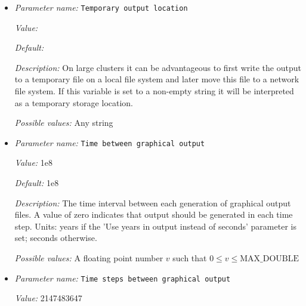 \begin{itemize}
{\it Value:} false


{\it Default:} false


{\it Description:} For free surface computations Aspect uses an Arbitrary-Lagrangian-Eulerian formulation to handle deforming the domain, so the mesh has its own velocity field.  This may be written as an output field by setting this parameter to true.


{\it Possible values:} A boolean value (true or false)
\item {\it Parameter name:} {\tt Temporary output location}
\label{parameters:Postprocess/Visualization/Temporary output location}


{\it Value:} 


{\it Default:} 


{\it Description:} On large clusters it can be advantageous to first write the output to a temporary file on a local file system and later move this file to a network file system. If this variable is set to a non-empty string it will be interpreted as a temporary storage location.


{\it Possible values:} Any string
\item {\it Parameter name:} {\tt Time between graphical output}
\label{parameters:Postprocess/Visualization/Time between graphical output}


{\it Value:} 1e8


{\it Default:} 1e8


{\it Description:} The time interval between each generation of graphical output files. A value of zero indicates that output should be generated in each time step. Units: years if the 'Use years in output instead of seconds' parameter is set; seconds otherwise.


{\it Possible values:} A floating point number $v$ such that $0 \leq v \leq \text{MAX\_DOUBLE}$
\item {\it Parameter name:} {\tt Time steps between graphical output}
\label{parameters:Postprocess/Visualization/Time steps between graphical output}


{\it Value:} 2147483647



\end{itemize}
